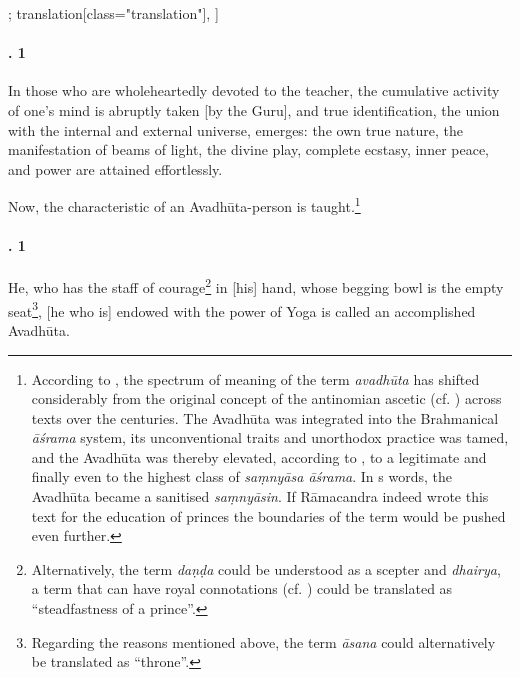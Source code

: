 \begin{alignment}[
  texts=edition[class="edition"];
  translation[class="translation"],
  ]
\begin{translation}
\begin{tlate}[p43_01]
\end{tlate}
\begin{tlate}[43_1]
 \paragraph{. 1} In those who are wholeheartedly devoted to the teacher, the cumulative activity of one's mind is abruptly taken [by the Guru], and true identification, the union with the internal and external universe, emerges: the own true nature, the manifestation of beams of light, the divine play, complete ecstasy, inner peace, and power are attained effortlessly.
\end{tlate}
\begin{tlate}[43_02]
  Now, the characteristic of an Avadhūta-person is taught.\footnote{According to \citeauthor{pudi2023}, the spectrum of meaning of the term \textit{avadhūta} has shifted considerably from the original concept of the antinomian ascetic (cf. \citeauthor[2023]{pudi2023}) across texts over the centuries. The Avadhūta was integrated into the Brahmanical \textit{āśrama} system, its unconventional traits and unorthodox practice was tamed, and the Avadhūta was thereby elevated, according to \citeauthor{pudi2023}, to a legitimate and finally even to the highest class of \textit{saṃnyāsa āśrama}. In \citeauthor{pudi2023}s words, the Avadhūta became a sanitised \textit{saṃnyāsin}. If Rāmacandra indeed wrote this text for the education of princes the boundaries of the term would be pushed even further.}
  \end{tlate}
  \begin{tlate}[44_1]
  \paragraph{. 1} He, who has the staff of courage\footnote{Alternatively, the term \textit{daṇḍa} could be understood as a scepter and \textit{dhairya}, a term that can have royal connotations (cf. \citeauthor[1858:167]{petersburger3}) could be translated as ``steadfastness of a prince''.} in [his] hand, whose begging bowl is the empty seat\footnote{Regarding the reasons mentioned above, the term \textit{āsana} could alternatively be translated as ``throne''.}, [he who is] endowed with the power of Yoga is called an accomplished Avadhūta.
    \end{tlate}
  \end{translation}
\end{alignment}
